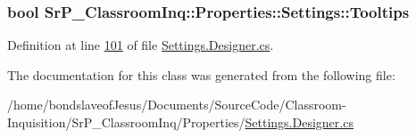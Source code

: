 \hypertarget{class_sr_p___classroom_inq_1_1_properties_1_1_settings_a321180f5ee03a2226b34422de41e201a}{
\subsubsection[{\-Tooltips}]{\setlength{\rightskip}{0pt plus 5cm}bool \-Sr\-P\-\_\-\-Classroom\-Inq\-::\-Properties\-::\-Settings\-::\-Tooltips}}
\label{class_sr_p___classroom_inq_1_1_properties_1_1_settings_a321180f5ee03a2226b34422de41e201a}


\-Definition at line \hyperlink{_settings_8_designer_8cs_source_l00101}{101} of file \hyperlink{_settings_8_designer_8cs_source}{\-Settings.\-Designer.\-cs}.



\-The documentation for this class was generated from the following file\-:\begin{DoxyCompactItemize}
\item 
/home/bondslaveof\-Jesus/\-Documents/\-Source\-Code/\-Classroom-\/\-Inquisition/\-Sr\-P\-\_\-\-Classroom\-Inq/\-Properties/\hyperlink{_settings_8_designer_8cs}{\-Settings.\-Designer.\-cs}\end{DoxyCompactItemize}
